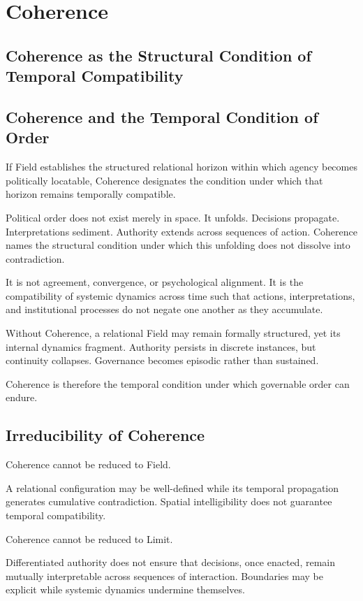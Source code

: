 \documentclass[12pt]{article}
\begin{document}
\section{Coherence}


\subsection*{Coherence as the Structural Condition of Temporal Compatibility}


\subsection{Coherence and the Temporal Condition of Order}


If Field establishes the structured relational horizon within which agency becomes politically locatable, Coherence designates the condition under which that horizon remains temporally compatible.

Political order does not exist merely in space. It unfolds. Decisions propagate. Interpretations sediment. Authority extends across sequences of action. Coherence names the structural condition under which this unfolding does not dissolve into contradiction.

It is not agreement, convergence, or psychological alignment. It is the compatibility of systemic dynamics across time such that actions, interpretations, and institutional processes do not negate one another as they accumulate.

Without Coherence, a relational Field may remain formally structured, yet its internal dynamics fragment. Authority persists in discrete instances, but continuity collapses. Governance becomes episodic rather than sustained.

Coherence is therefore the temporal condition under which governable order can endure.

\subsection{Irreducibility of Coherence}


Coherence cannot be reduced to Field.

A relational configuration may be well-defined while its temporal propagation generates cumulative contradiction. Spatial intelligibility does not guarantee temporal compatibility.

Coherence cannot be reduced to Limit.

Differentiated authority does not ensure that decisions, once enacted, remain mutually interpretable across sequences of interaction. Boundaries may be explicit while systemic dynamics undermine themselves.
\end{document}
